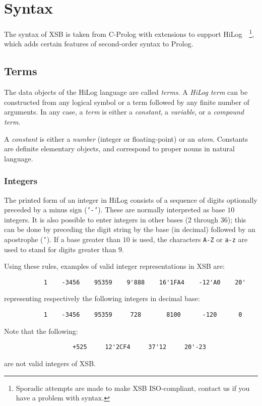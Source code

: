 \chapter{Syntax} \label{Syntax}

The syntax of XSB is taken from C-Prolog with extensions to support
HiLog~\cite{ChKW93}~\footnote{Sporadic attempts are made to make XSB
ISO-compliant, contact us if you have a problem with syntax.}, which
adds certain features of second-order syntax to Prolog.

\section{Terms} \label{TermSyntax}
The data objects of the HiLog language are called {\em terms}.
A {\em HiLog term} can be constructed from any logical symbol or a term
followed by any finite number of arguments.  In any case, a {\em term}
is either a {\em constant}, a {\em variable}, or a {\em compound term}.

A {\em constant} is either a {\em number} (integer or floating-point) or an
{\em atom}.  Constants are definite elementary objects, and correspond to
proper nouns in natural language.


\subsection{Integers}
The printed form of an integer in HiLog consists of a sequence of digits
optionally preceded by a minus sign ({\tt '-'}).  These are normally 
interpreted as base $10$ integers.  It is also possible to enter integers
in other bases ($2$ through $36$); this can be done by preceding the digit
string by the base (in decimal) followed by an apostrophe ({\tt '}).  If a
base greater than $10$ is used, the characters {\tt A-Z} or {\tt a-z} are
used to stand for digits greater than $9$.

Using these rules, examples of valid integer representations in XSB are:
\begin{verbatim}
           1    -3456    95359    9'888    16'1FA4    -12'A0    20'
\end{verbatim}
representing respectively the following integers in decimal base:
\begin{verbatim}
           1    -3456    95359     728       8100      -120      0
\end{verbatim}

Note that the following:
\begin{verbatim}
                   +525     12'2CF4     37'12     20'-23
\end{verbatim}
are not valid integers of XSB.

